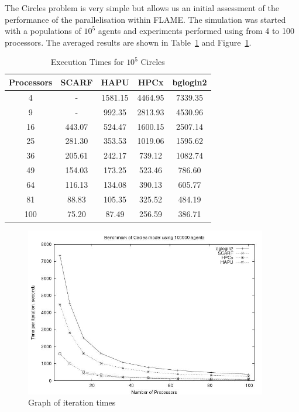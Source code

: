The Circles problem is very simple but allows us an initial assessment of the performance of the parallelisation within FLAME. The simulation was started with a populations of $10^5$  agents and experiments performed using from 4 to 100 processors. The averaged results are shown in Table~\ref{tab:ExecutionTimesForCircles} and Figure~\ref{fig:Circles-graph}.

{
\renewcommand{\arraystretch}{1.25}
\begin{table}[ht]
 \centering
  \begin{tabular}{c|cccc}
 Processors &SCARF  &HAPU  &HPCx  &bglogin2 \\ \hline
4 &- &1581.15 &4464.95 &7339.35 \\
9 &- &992.35 &2813.93 &4530.96  \\
16 &443.07 &524.47 &1600.15 &2507.14    \\
25 &281.30 &353.53 &1019.06 &1595.62    \\
36 &205.61 &242.17 &739.12 &1082.74     \\
49 &154.03 &173.25 &523.46 &786.60      \\
64 &116.13 &134.08 &390.13 &605.77      \\
81 &88.83 &105.35 &325.52 &484.19       \\
100 &75.20 &87.49 &256.59 &386.71       \\
 \end{tabular}
 \caption{Execution Times for $10^5$ Circles}
 \label{tab:ExecutionTimesForCircles}
\end{table}
}

\begin{figure}[ht]
 \centering
  \includegraphics[width=300pt]{Circles-graph.jpg}
 \caption{Graph of iteration times}
 \label{fig:Circles-graph}
\end{figure}

